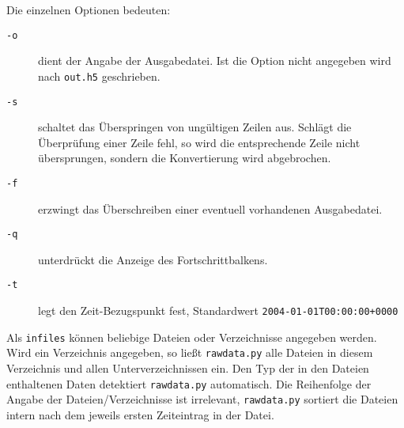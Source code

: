 \documentclass[version=last,
	a4paper,			%
	pagesize, 			%
	11pt,				%
	BCOR1cm,			%
	DIV12,	 			%
	pointlessnumbers,   %
	halfparskip,		%
]{scrreprt}
\begin{document}
Die einzelnen Optionen bedeuten:
\begin{description}
  \item[\verb"-o"] dient der Angabe der Ausgabedatei. Ist die Option nicht angegeben wird nach \texttt{out.h5} geschrieben.
  \item[\verb"-s"] schaltet das Überspringen von ungültigen Zeilen aus. Schlägt die Überprüfung einer Zeile fehl, so wird die entsprechende Zeile nicht übersprungen, sondern die Konvertierung wird abgebrochen.
  \item[\verb"-f"] erzwingt das Überschreiben einer eventuell vorhandenen Ausgabedatei.
  \item[\verb"-q"] unterdrückt die Anzeige des Fortschrittbalkens.
  \item[\verb"-t"] legt den Zeit-Bezugspunkt fest, Standardwert \texttt{2004-01-01T00:00:00+0000}
\end{description}

Als \texttt{infiles} können beliebige Dateien oder Verzeichnisse angegeben werden. Wird ein Verzeichnis angegeben, so ließt \texttt{rawdata.py} alle Dateien in diesem Verzeichnis und allen Unterverzeichnissen ein. Den Typ der in den Dateien enthaltenen Daten detektiert \texttt{rawdata.py} automatisch. Die Reihenfolge der Angabe der Dateien/Verzeichnisse ist irrelevant, \texttt{rawdata.py} sortiert die Dateien intern nach dem jeweils ersten Zeiteintrag in der Datei.
\end{document}
